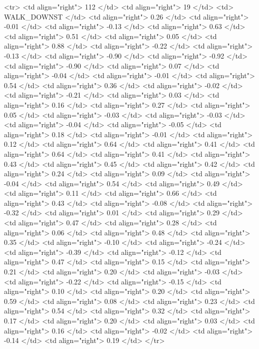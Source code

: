   <tr> <td align="right"> 112 </td> <td align="right">  19 </td> <td> WALK_DOWNST </td> <td align="right"> 0.26 </td> <td align="right"> -0.01 </td> <td align="right"> -0.13 </td> <td align="right"> 0.63 </td> <td align="right"> 0.51 </td> <td align="right"> 0.05 </td> <td align="right"> 0.88 </td> <td align="right"> -0.22 </td> <td align="right"> -0.13 </td> <td align="right"> -0.90 </td> <td align="right"> -0.92 </td> <td align="right"> -0.90 </td> <td align="right"> 0.07 </td> <td align="right"> -0.04 </td> <td align="right"> -0.01 </td> <td align="right"> 0.54 </td> <td align="right"> 0.36 </td> <td align="right"> -0.02 </td> <td align="right"> -0.21 </td> <td align="right"> 0.03 </td> <td align="right"> 0.16 </td> <td align="right"> 0.27 </td> <td align="right"> 0.05 </td> <td align="right"> -0.03 </td> <td align="right"> -0.03 </td> <td align="right"> -0.04 </td> <td align="right"> -0.05 </td> <td align="right"> 0.18 </td> <td align="right"> -0.01 </td> <td align="right"> 0.12 </td> <td align="right"> 0.64 </td> <td align="right"> 0.41 </td> <td align="right"> 0.64 </td> <td align="right"> 0.41 </td> <td align="right"> 0.43 </td> <td align="right"> 0.45 </td> <td align="right"> 0.42 </td> <td align="right"> 0.24 </td> <td align="right"> 0.09 </td> <td align="right"> -0.04 </td> <td align="right"> 0.54 </td> <td align="right"> 0.49 </td> <td align="right"> 0.11 </td> <td align="right"> 0.66 </td> <td align="right"> 0.43 </td> <td align="right"> -0.08 </td> <td align="right"> -0.32 </td> <td align="right"> 0.01 </td> <td align="right"> 0.29 </td> <td align="right"> 0.47 </td> <td align="right"> 0.28 </td> <td align="right"> 0.06 </td> <td align="right"> 0.48 </td> <td align="right"> 0.35 </td> <td align="right"> -0.10 </td> <td align="right"> -0.24 </td> <td align="right"> -0.39 </td> <td align="right"> -0.12 </td> <td align="right"> 0.47 </td> <td align="right"> 0.15 </td> <td align="right"> 0.21 </td> <td align="right"> 0.20 </td> <td align="right"> -0.03 </td> <td align="right"> -0.22 </td> <td align="right"> -0.15 </td> <td align="right"> 0.10 </td> <td align="right"> 0.20 </td> <td align="right"> 0.59 </td> <td align="right"> 0.08 </td> <td align="right"> 0.23 </td> <td align="right"> 0.54 </td> <td align="right"> 0.32 </td> <td align="right"> 0.17 </td> <td align="right"> 0.20 </td> <td align="right"> 0.03 </td> <td align="right"> 0.16 </td> <td align="right"> -0.02 </td> <td align="right"> -0.14 </td> <td align="right"> 0.19 </td> </tr>
